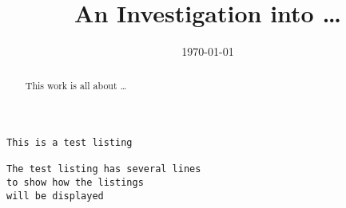 \documentclass[sotoncolour]{uosproject}     %
\title      {An Investigation into \dots}
\date       {\today}
\begin{document}
\frontmatter
\maketitle
\begin{abstract}
This work is all about \dots
\end{abstract}
\tableofcontents
\listoffigures
\listoftables
\lstlistoflistings
\listofaddmaterial
{}
\mainmatter


\begin{lstlisting}[caption=Listing of what an example listing would be like]
This is a test listing

The test listing has several lines
to show how the listings
will be displayed
\end{lstlisting}
\appendix

\backmatter


\end{document}
